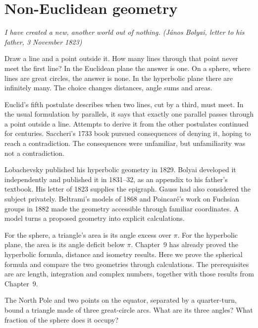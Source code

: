 \chapter{Non-Euclidean geometry}\label{geometry:ch:noneuclid}

\begin{center}\itshape
I have created a new, another world out of nothing.
\upshape(J\'anos Bolyai, letter to his father, 3 November 1823)
\end{center}

Draw a line and a point outside it. How many lines through that point never
meet the first line? In the Euclidean plane the answer is one. On a sphere,
where lines are great circles, the answer is none. In the hyperbolic plane
there are infinitely many. The choice changes distances, angle sums and areas.

Euclid's fifth postulate describes when two lines, cut by a third, must meet.
In the usual formulation by parallels, it says that exactly one parallel
passes through a point outside a line. Attempts to derive it from the other
postulates continued for centuries. Saccheri's 1733 book pursued consequences
of denying it, hoping to reach a contradiction. The consequences were
unfamiliar, but unfamiliarity was not a contradiction.

Lobachevsky published his hyperbolic geometry in 1829. Bolyai developed it
independently and published it in 1831--32, as an appendix to his father's
textbook. His letter of 1823 supplies the epigraph. Gauss had also considered
the subject privately. Beltrami's models of 1868 and Poincar\'e's work on
Fuchsian groups in 1882 made the geometry accessible through familiar
coordinates. A model turns a proposed geometry into explicit calculations.

For the sphere, a triangle's area is its angle excess over $\pi$.
For the hyperbolic plane, the area is its angle deficit below $\pi$.
Chapter~9 has already proved the hyperbolic formula, distance and isometry
results. Here we prove the spherical formula and compare the two geometries
through calculations. The prerequisites are arc length, integration and
complex numbers, together with those results from Chapter~9.

\begin{think}
The North Pole and two points on the equator, separated by a quarter-turn,
bound a triangle made of three great-circle arcs. What are its three angles?
What fraction of the sphere does it occupy?
\end{think}

